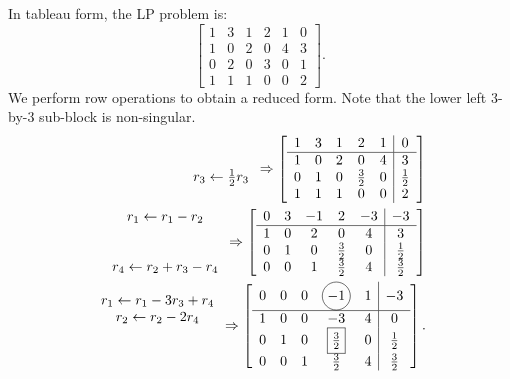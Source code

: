 \begin{example}
In tableau form, the LP problem is:
\[
\left[\begin{array}{ccccc|c} 1 & 3 & 1 & 2 & 1 & 0\\\hline 1 & 0 & 2 & 0 & 4 & 3\\ 0 & 2 & 0 & 3 & 0 & 1\\ 1 & 1 & 1 & 0 & 0 & 2\end{array}\right].
\]
We perform row operations to obtain a reduced form. Note that the lower left $3$-by-$3$ sub-block is non-singular.
\begin{align*}
\begin{array}{c} ~\\r_3 \leftarrow \tfrac{1}{2}r_3\end{array} \Rightarrow \left[\begin{array}{ccccc|c} 1 & 3 & 1 & 2 & 1 & 0\\\hline 1 & 0 & 2 & 0 & 4 & 3\\ 0 & 1 & 0 & \tfrac{3}{2} & 0 & \tfrac{1}{2}\\ 1 & 1 & 1 & 0 & 0 & 2\end{array}\right]\\
\begin{array}{c} r_1 \leftarrow r_1-r_2\\~\\~\\r_4\leftarrow r_2+r_3-r_4\end{array} \Rightarrow \left[\begin{array}{ccccc|c} 0 & 3 & -1 & 2 & -3 & -3\\\hline 1 & 0 & 2 & 0 & 4 & 3\\ 0 & 1 & 0 & \tfrac{3}{2} & 0 & \tfrac{1}{2}\\ 0 & 0 & 1 & \tfrac{3}{2} & 4 & \tfrac{3}{2}\end{array}\right]\\
\begin{array}{c} r_1 \leftarrow r_1-3r_3+r_4\\r_2\leftarrow r_2-2r_4\\~\\~\end{array} \Rightarrow \left[\begin{array}{ccccc|c} 0 & 0 & 0 & \circled{$-{\rm 1}$} & 1 & -3\\\hline 1 & 0 & 0 & -3 & 4 & 0\\ 0 & 1 & 0 & \fbox{$\tfrac{3}{2}$} & 0 & \tfrac{1}{2}\\ 0 & 0 & 1 & \tfrac{3}{2} & 4 & \tfrac{3}{2}\end{array}\right].

\end{align*}
\end{example}
